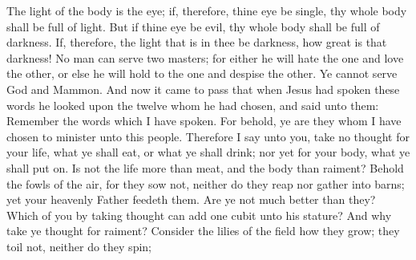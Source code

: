 The light of the body is the eye; if, therefore, thine eye be single, thy whole body shall be full of light.
\bverse \iffalse But if thine eye be evil, thy whole body shall be full of darkness. If, therefore, the light that is in thee be darkness, how great is that darkness! \fi
But if thine eye be evil, thy whole body shall be full of darkness. If, therefore, the light that is in thee be darkness, how great is that darkness!
\bverse \iffalse No man can serve two masters; for either he will hate the one and love the other, or else he will hold to the one and despise the other. Ye cannot serve God and Mammon. \fi
No man can serve two masters; for either he will hate the one and love the other, or else he will hold to the one and despise the other. Ye cannot serve God and Mammon.
\bverse \iffalse And now it came to pass that when Jesus had spoken these words he looked upon the twelve whom he had chosen, and said unto them: Remember the words which I have spoken. For behold, ye are they whom I have chosen to minister unto this people. Therefore I say unto you, take no thought for your life, what ye shall eat, or what ye shall drink; nor yet for your body, what ye shall put on. Is not the life more than meat, and the body than raiment? \fi
And now it came to pass that when Jesus had spoken these words he looked upon the twelve whom he had chosen, and said unto them: Remember the words which I have spoken. For behold, ye are they whom I have chosen to minister unto this people. Therefore I say unto you, take no thought for your life, what ye shall eat, or what ye shall drink; nor yet for your body, what ye shall put on. Is not the life more than meat, and the body than raiment?
\bverse \iffalse Behold the fowls of the air, for they sow not, neither do they reap nor gather into barns; yet your heavenly Father feedeth them. Are ye not much better than they? \fi
Behold the fowls of the air, for they sow not, neither do they reap nor gather into barns; yet your heavenly Father feedeth them. Are ye not much better than they?
\bverse \iffalse Which of you by taking thought can add one cubit unto his stature? \fi
Which of you by taking thought can add one cubit unto his stature?
\bverse \iffalse And why take ye thought for raiment? Consider the lilies of the field how they grow; they toil not, neither do they spin; \fi
And why take ye thought for raiment? Consider the lilies of the field how they grow; they toil not, neither do they spin;
\bverse \iffalse And yet I say unto you, that even Solomon, in all his glory, was not arrayed like one of these. \fi
